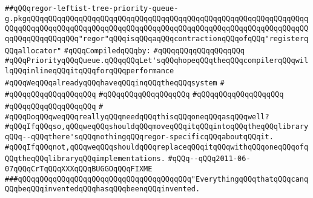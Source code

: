 \label{src/lib/compiler/back/low/regor/regor-leftist-tree-priority-queue-g.pkg}
\verb|##qQQqregor-leftist-tree-priority-queue-g.pkgqQQqqQQqqQQqqQQqqQQqqQQqqQQqqQQqqQQqqQQqqQQqqQQqqQQqqQQqqQQqqQQqqQQqqQQqqQQqqQQqqQQqqQQqqQQqqQQqqQQqqQQqqQQqqQQqqQQqqQQqqQQqqQQqqQQqqQQqqQQqqQQqqQQqqQQq"regor"qQQqisqQQqaqQQqcontractionqQQqofqQQq"registerqQQqallocator"|\newline
\newline
\verb|#qQQqCompiledqQQqby:|\newline
\verb|#qQQqqQQqqQQqqQQqqQQq|\newline
\newline
\verb|#qQQqPriorityqQQqQueue.qQQqqQQqLet'sqQQqhopeqQQqtheqQQqcompilerqQQqwillqQQqinlineqQQqitqQQqforqQQqperformance|\newline
\newline
\verb|#qQQqWeqQQqalreadyqQQqhaveqQQqinqQQqtheqQQqsystem|\newline
\verb|#|\newline
\verb|#qQQqqQQqqQQqqQQqqQQq|\newline
\verb|#qQQqqQQqqQQqqQQqqQQq|\newline
\verb|#qQQqqQQqqQQqqQQqqQQq|\newline
\verb|#qQQqqQQqqQQqqQQqqQQq|\newline
\verb|#|\newline
\verb|#qQQqDoqQQqweqQQqreallyqQQqneedqQQqthisqQQqoneqQQqasqQQqwell?|\newline
\verb|#qQQqIfqQQqso,qQQqweqQQqshouldqQQqmoveqQQqitqQQqintoqQQqtheqQQqlibraryqQQq--qQQqthere'sqQQqnothingqQQqregor-specificqQQqaboutqQQqit.|\newline
\verb|#qQQqIfqQQqnot,qQQqweqQQqshouldqQQqreplaceqQQqitqQQqwithqQQqoneqQQqofqQQqtheqQQqlibraryqQQqimplementations.|\newline
\verb|#qQQq--qQQq2011-06-07qQQqCrTqQQqXXXqQQqBUGGOqQQqFIXME|\newline
\newline
\newline
\verb|###qQQqqQQqqQQqqQQqqQQqqQQqqQQqqQQqqQQqqQQq"EverythingqQQqthatqQQqcanqQQqbeqQQqinventedqQQqhasqQQqbeenqQQqinvented.|\newline
